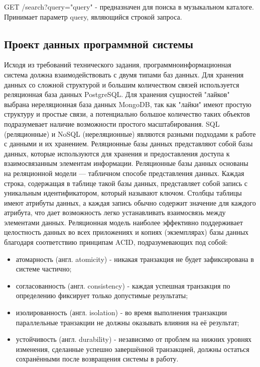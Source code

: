 GET /search?query="{query}" - предназначен для поиска в музыкальном каталоге. Принимает параметр query, являющийся строкой запроса.


\subsection{Проект данных программной системы}

Исходя из требований технического задания, программноинформационная система должна взаимодействовать с двумя типами баз
данных.
Для хранения данных со сложной структурой и большим количеством связей используется реляционная база данных PostgreSQL. 
Для хранения сущностей "лайков" выбрана нереляционная база данных MongoDB, так как "лайки" имеют простую структуру и простые связи, а потенциально большое количество таких объектов подразумевает наличие возможности простого масштабирования.
SQL\cite{sql1} (реляционные) и NoSQL (нереляционные) являются разными подходами к работе с данными и их хранением. Реляционные базы данных представляют собой базы данных, которые используются для хранения и предоставления доступа к взаимосвязанным элементам информации. Реляционные базы данных основаны на реляционной модели — табличном способе представления данных. Каждая строка, содержащая в таблице такой базы данных, представляет собой запись с уникальным идентификатором, который называют ключом. Столбцы таблицы имеют атрибуты данных, а каждая запись обычно содержит значение для каждого атрибута, что дает возможность легко устанавливать взаимосвязь между элементами данных. Реляционная модель наиболее эффективно поддерживает целостность данных во всех приложениях и копиях (экземплярах) базы данных благодаря соответствию принципам ACID, подразумевающих под собой:
\begin{itemize}
	\item атомарность (англ. atomicity) - никакая транзакция не будет зафиксирована в системе частично;
	\item согласованность (англ. consistency) - каждая успешная транзакция по определению фиксирует только допустимые результаты;
	\item изолированность (англ. isolation) - во время выполнения транзакции параллельные транзакции не должны оказывать влияния на её результат;
	\item устойчивость (англ. durability) - независимо от проблем на нижних уровнях изменения, сделанные успешно завершённой транзакцией, должны остаться сохранёнными после возвращения системы в работу.
\end{itemize}
